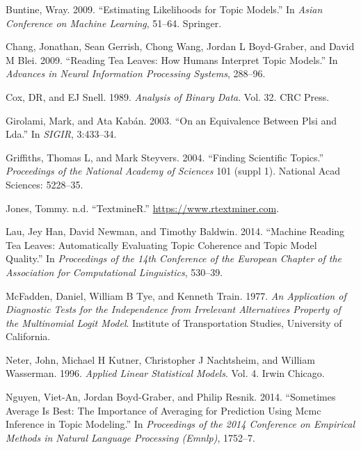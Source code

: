 \documentclass[conference,final,]{IEEEtran}
\begin{document}
\leavevmode\hypertarget{ref-buntine2009estimating}{}%
Buntine, Wray. 2009. ``Estimating Likelihoods for Topic Models.'' In
\emph{Asian Conference on Machine Learning}, 51--64. Springer.

\leavevmode\hypertarget{ref-chang2009reading}{}%
Chang, Jonathan, Sean Gerrish, Chong Wang, Jordan L Boyd-Graber, and
David M Blei. 2009. ``Reading Tea Leaves: How Humans Interpret Topic
Models.'' In \emph{Advances in Neural Information Processing Systems},
288--96.

\leavevmode\hypertarget{ref-cox1989analysis}{}%
Cox, DR, and EJ Snell. 1989. \emph{Analysis of Binary Data}. Vol. 32.
CRC Press.

\leavevmode\hypertarget{ref-girolami2003equivalence}{}%
Girolami, Mark, and Ata Kabán. 2003. ``On an Equivalence Between Plsi
and Lda.'' In \emph{SIGIR}, 3:433--34.

\leavevmode\hypertarget{ref-griffiths2004finding}{}%
Griffiths, Thomas L, and Mark Steyvers. 2004. ``Finding Scientific
Topics.'' \emph{Proceedings of the National Academy of Sciences} 101
(suppl 1). National Acad Sciences: 5228--35.

\leavevmode\hypertarget{ref-textminer}{}%
Jones, Tommy. n.d. ``TextmineR.'' \url{https://www.rtextminer.com}.

\leavevmode\hypertarget{ref-lau2014machine}{}%
Lau, Jey Han, David Newman, and Timothy Baldwin. 2014. ``Machine Reading
Tea Leaves: Automatically Evaluating Topic Coherence and Topic Model
Quality.'' In \emph{Proceedings of the 14th Conference of the European
Chapter of the Association for Computational Linguistics}, 530--39.

\leavevmode\hypertarget{ref-mcfadden1977application}{}%
McFadden, Daniel, William B Tye, and Kenneth Train. 1977. \emph{An
Application of Diagnostic Tests for the Independence from Irrelevant
Alternatives Property of the Multinomial Logit Model}. Institute of
Transportation Studies, University of California.

\leavevmode\hypertarget{ref-neter1996applied}{}%
Neter, John, Michael H Kutner, Christopher J Nachtsheim, and William
Wasserman. 1996. \emph{Applied Linear Statistical Models}. Vol. 4. Irwin
Chicago.

\leavevmode\hypertarget{ref-nguyen2014sometimes}{}%
Nguyen, Viet-An, Jordan Boyd-Graber, and Philip Resnik. 2014.
``Sometimes Average Is Best: The Importance of Averaging for Prediction
Using Mcmc Inference in Topic Modeling.'' In \emph{Proceedings of the
2014 Conference on Empirical Methods in Natural Language Processing
(Emnlp)}, 1752--7.
\end{document}
